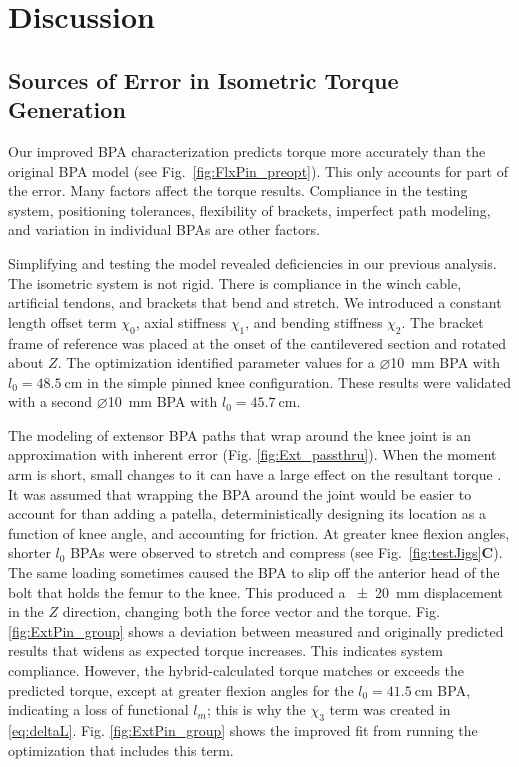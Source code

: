 \section{Discussion}

\subsection{Sources of Error in Isometric Torque Generation}\label{sec:disc_error}

Our improved BPA characterization predicts torque more accurately than the original BPA model (see Fig.~\ref{fig:FlxPin_preopt}). This only accounts for part of the error. Many factors affect the torque results. Compliance in the testing system, positioning tolerances, flexibility of brackets, imperfect path modeling, and variation in individual BPAs are other factors.

Simplifying and testing the model revealed deficiencies in our previous analysis. The isometric system is not rigid. There is compliance in the winch cable, artificial tendons, and brackets that bend and stretch. We introduced a constant length offset term $\chi_{0}$, axial stiffness $\chi_{1}$, and bending stiffness $\chi_{2}$. The bracket frame of reference was placed at the onset of the cantilevered section and rotated about $Z$.  The optimization identified parameter values for a $\diameter$\qty{10}{\mm} BPA with $l_{0}=\qty{48.5}{\cm}$ in the simple pinned knee configuration. These results were validated with a second $\diameter$\qty{10}{\mm} BPA with $l_{0}=\qty{45.7}{\cm}$.

The modeling of extensor BPA paths that wrap around the knee joint is an approximation with inherent error (Fig. \ref{fig:Ext_passthru}). When the moment arm is short, small changes to it can have a large effect on the resultant torque \citep{young_analyzing_2019}. It was assumed that wrapping the BPA around the joint would be easier to account for than adding a patella, deterministically designing its location as a function of knee angle, and accounting for friction. At greater knee flexion angles, shorter $l_{0}$ BPAs were observed to stretch and compress (see Fig.~\ref{fig:testJigs}\textbf{C}). The same loading sometimes caused the BPA to slip off the anterior head of the bolt that holds the femur to the knee. This produced a \qty{\pm 20}{\mm} displacement in the $Z$ direction, changing both the force vector and the torque. Fig. \ref{fig:ExtPin_group} shows a deviation between measured and originally predicted results that widens as expected torque increases. This indicates system compliance. However, the hybrid-calculated torque matches or exceeds the predicted torque, except at greater flexion angles for the $l_{0}=\qty{41.5}{\cm}$ BPA, indicating a loss of functional $l_m$; this is why the $\chi_{3}$ term was created in \eqref{eq:deltaL}. Fig. \ref{fig:ExtPin_group} shows the improved fit from running the optimization that includes this term.

